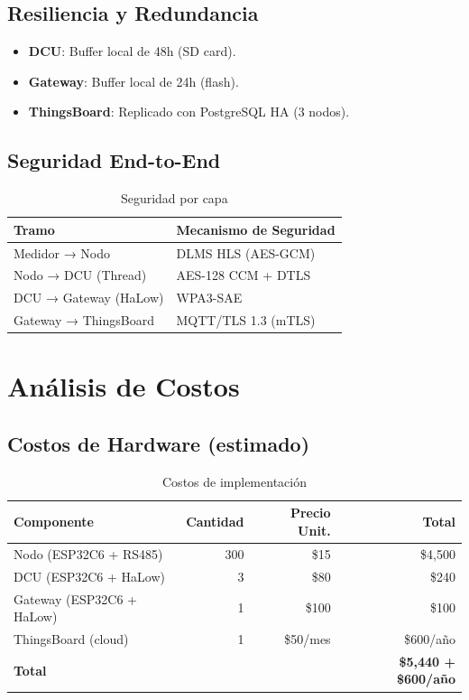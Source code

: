 \subsection{Resiliencia y Redundancia}

\begin{itemize}
    \item \textbf{DCU}: Buffer local de 48h (SD card).
    \item \textbf{Gateway}: Buffer local de 24h (flash).
    \item \textbf{ThingsBoard}: Replicado con PostgreSQL HA (3 nodos).
\end{itemize}

\subsection{Seguridad End-to-End}

\begin{table}[h]
\centering
\begin{tabular}{|l|l|}
\hline
\textbf{Tramo} & \textbf{Mecanismo de Seguridad} \\
\hline
Medidor → Nodo & DLMS HLS (AES-GCM) \\
Nodo → DCU (Thread) & AES-128 CCM + DTLS \\
DCU → Gateway (HaLow) & WPA3-SAE \\
Gateway → ThingsBoard & MQTT/TLS 1.3 (mTLS) \\
\hline
\end{tabular}
\caption{Seguridad por capa}
\label{tab:seguridad-capas}
\end{table}

\section{Análisis de Costos}

\subsection{Costos de Hardware (estimado)}

\begin{table}[h]
\centering
\begin{tabular}{|l|r|r|r|}
\hline
\textbf{Componente} & \textbf{Cantidad} & \textbf{Precio Unit.} & \textbf{Total} \\
\hline
Nodo (ESP32C6 + RS485) & 300 & \$15 & \$4,500 \\
DCU (ESP32C6 + HaLow) & 3 & \$80 & \$240 \\
Gateway (ESP32C6 + HaLow) & 1 & \$100 & \$100 \\
ThingsBoard (cloud) & 1 & \$50/mes & \$600/año \\
\hline
\textbf{Total} & & & \textbf{\$5,440 + \$600/año} \\
\hline
\end{tabular}
\caption{Costos de implementación}
\label{tab:costos}
\end{table}

